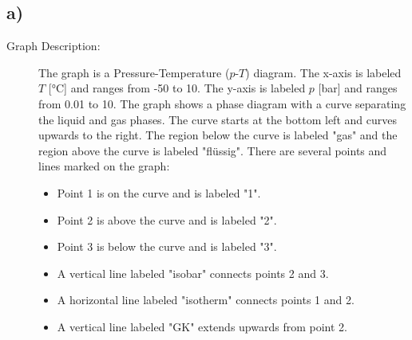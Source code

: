 

\subsection*{a)}

\begin{description}
    \item[Graph Description:] The graph is a Pressure-Temperature ($p$-$T$) diagram. The x-axis is labeled $T$ [°C] and ranges from -50 to 10. The y-axis is labeled $p$ [bar] and ranges from 0.01 to 10. The graph shows a phase diagram with a curve separating the liquid and gas phases. The curve starts at the bottom left and curves upwards to the right. The region below the curve is labeled "gas" and the region above the curve is labeled "flüssig". There are several points and lines marked on the graph:
    \begin{itemize}
        \item Point 1 is on the curve and is labeled "1".
        \item Point 2 is above the curve and is labeled "2".
        \item Point 3 is below the curve and is labeled "3".
        \item A vertical line labeled "isobar" connects points 2 and 3.
        \item A horizontal line labeled "isotherm" connects points 1 and 2.
        \item A vertical line labeled "GK" extends upwards from point 2.
    \end{itemize}
\end{description}